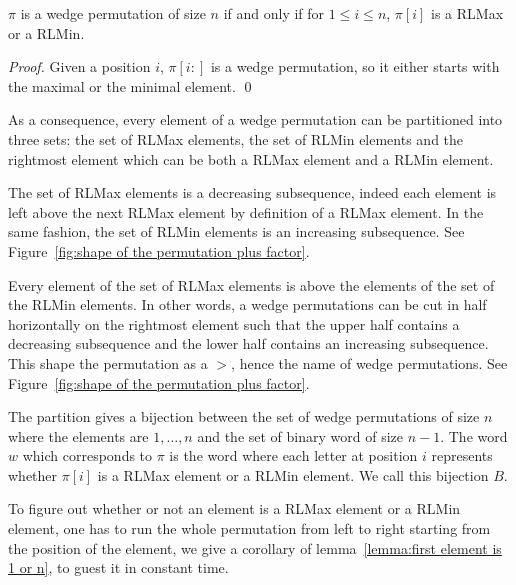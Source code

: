 \documentclass[a4paper]{llncs}
\newcommand{\bijection}{B}
\begin{document}
\begin{corollary}
\label{corollary:minmaxelement}
$\pi$ is a wedge permutation of size $n$ if and only if for $1 \leq i \leq n$,
$\pi[i]$ is a RLMax or a RLMin.
\end{corollary}

\begin{proof} %
Given a position $i$, $\pi[i:]$ is a wedge permutation,
so it either starts with the maximal or the minimal element.
\qed
\end{proof}

As a consequence, every element of a wedge permutation can be partitioned
into three sets: the set of RLMax elements, the set of RLMin elements and the
rightmost element which can be both a RLMax element and a RLMin element.

\begin{remark}
The set of RLMax elements is a decreasing subsequence,
indeed each element is left above the next RLMax element by definition
of a RLMax element. In the same fashion,
the set of RLMin elements is an increasing subsequence.
See Figure~\ref{fig:shape of the permutation plus factor}.
\end{remark}

\begin{remark}
Every element of the set of RLMax elements is above the elements
of the set of the RLMin elements.
In other words, a wedge permutations
can be cut in half horizontally on the rightmost element such that the upper half contains a decreasing
subsequence and the lower half contains an increasing subsequence.
This shape the permutation as a $>$,
hence the name of wedge permutations.
See Figure~\ref{fig:shape of the permutation plus factor}.
\end{remark}

\begin{remark}
The partition gives a bijection between the set of wedge permutations of size $n$ where the elements are $1,\ldots,n$
and the set of binary word of size $n-1$.
The word $w$ which corresponds to $\pi$ is the word where each letter at position $i$
represents whether $\pi[i]$ is a RLMax element or a RLMin element.
We call this bijection $\bijection$.
\end{remark}

To figure out whether or not an element is a RLMax element or a RLMin element,
one has to run the whole permutation from left to right starting
from the position of the element, we give a corollary of lemma~\ref{lemma:first element is 1 or n}, to guest it in constant time.
\end{document}
